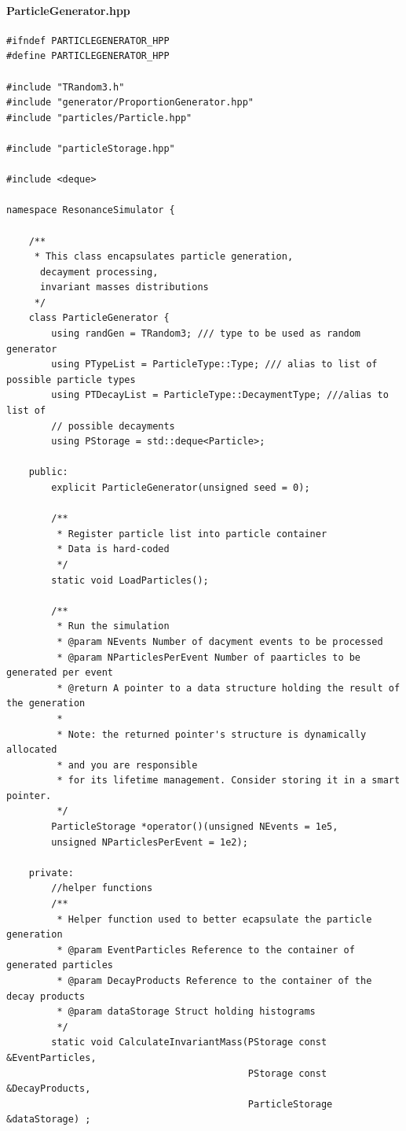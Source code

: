 \documentclass[12pt, a4paper]{article}
\begin{document}
\paragraph{ParticleGenerator.hpp}

\begin{verbatim}
#ifndef PARTICLEGENERATOR_HPP
#define PARTICLEGENERATOR_HPP

#include "TRandom3.h"
#include "generator/ProportionGenerator.hpp"
#include "particles/Particle.hpp"

#include "particleStorage.hpp"

#include <deque>

namespace ResonanceSimulator {

    /**
     * This class encapsulates particle generation,
      decayment processing, 
      invariant masses distributions
     */
    class ParticleGenerator {
        using randGen = TRandom3; /// type to be used as random generator
        using PTypeList = ParticleType::Type; /// alias to list of possible particle types
        using PTDecayList = ParticleType::DecaymentType; ///alias to list of 
        // possible decayments
        using PStorage = std::deque<Particle>;

    public:
        explicit ParticleGenerator(unsigned seed = 0);

        /**
         * Register particle list into particle container
         * Data is hard-coded
         */
        static void LoadParticles();

        /**
         * Run the simulation
         * @param NEvents Number of dacyment events to be processed
         * @param NParticlesPerEvent Number of paarticles to be generated per event
         * @return A pointer to a data structure holding the result of the generation
         *
         * Note: the returned pointer's structure is dynamically allocated 
         * and you are responsible
         * for its lifetime management. Consider storing it in a smart pointer.
         */
        ParticleStorage *operator()(unsigned NEvents = 1e5, 
        unsigned NParticlesPerEvent = 1e2);

    private:
        //helper functions
        /**
         * Helper function used to better ecapsulate the particle generation
         * @param EventParticles Reference to the container of generated particles
         * @param DecayProducts Reference to the container of the decay products
         * @param dataStorage Struct holding histograms
         */
        static void CalculateInvariantMass(PStorage const &EventParticles,
                                           PStorage const &DecayProducts,
                                           ParticleStorage &dataStorage) ;


\end{verbatim}
\end{document}

